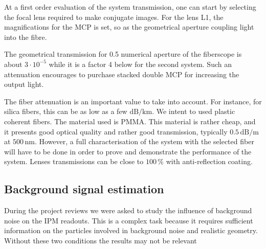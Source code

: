 \begin{refsection}
  

  At a first order evaluation of the system transmission, one can start by selecting the focal lens required to make conjugate images. For the lens L1, the magnifications for the MCP is set, so as the geometrical aperture coupling light into the fibre.


  The geometrical transmission for 0.5 numerical aperture of the fiberscope is about $3 \cdot 10^{-5}$ while it is a factor 4 below for the second system. Such an attenuation encourages to purchase stacked double MCP for increasing the output light.

  The fiber attenuation is an important value to take into account. For instance, for silica fibers, this can be as low as a few $\mathrm{dB/km}$. We intent to used plastic coherent fibers. The material used is PMMA. This material is rather cheap, and it presents good optical quality and rather good transmission, typically $0.5\,\mathrm{dB/m}$ at $500\,\mathrm{nm}$. However, a full characterisation of the system with the selected fiber will have to be done in order to prove and demonstrate the performance of the system. Lenses transmissions can be close to $100\,\mathrm{\%}$ with anti-reflection coating.

  \subsection{Background signal estimation}
  During the project reviews we were asked to study the influence of background noise on the IPM readouts. This is a complex task because it requires sufficient information on the particles involved in background noise and realistic geometry. Without these two conditions the results may not be relevant


\end{refsection}
